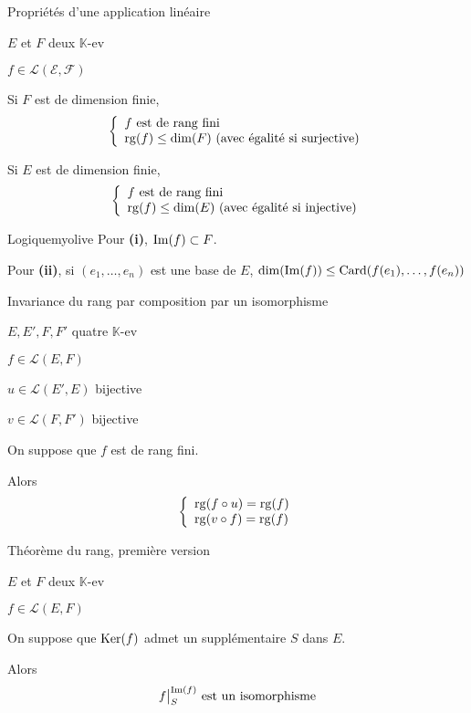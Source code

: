     \begin{prop}{Propriétés d’une application linéaire}{}
        \begin{soient}
            \item $E$ et $F$ deux $\mathbb{K}$-ev
            \item $f \in \mathcal{L}(\mathcal{E},\mathcal{F})$
        \end{soient}
        \begin{alors}
            \item Si $F$ est de dimension finie, 
            \[ \et{f \text{ est de rang fini}}{\rg(f) \leq \dim(F) \text{ (avec égalité si surjective)}} \]
            \item Si $E$ est de dimension finie, 
            \[ \et{f \text{ est de rang fini}}{\rg(f) \leq \dim(E) \text{ (avec égalité si injective)}} \]
        \end{alors}
    \end{prop}
    
    \begin{demo}{Logique}{myolive}
        Pour \textbf{(i)}, $\operatorname{Im}(f) \subset F$.
    
        Pour \textbf{(ii)}, si $(e_1,\ldots,e_n)$ est une base de $E$, $\dim(\operatorname{Im}(f)) \leq \operatorname{Card}(f(e_1),\ldots,f(e_n))$
    \end{demo}
    
    \begin{prop}{Invariance du rang par composition par un isomorphisme}{}
        \begin{soient}
            \item $E,E',F,F'$ quatre $\mathbb{K}$-ev
            \item $f \in \mathcal{L}(E,F)$
            \item $u \in \mathcal{L}(E',E)$ bijective
            \item $v \in \mathcal{L}(F,F')$ bijective
        \end{soient}
        On suppose que $f$ est de rang fini.
    
        Alors \[ \et{\rg(f \circ u) = \rg(f)}{\rg(v \circ f) = \rg(f)} \]
    \end{prop}

    \begin{theo}{Théorème du rang, première version}{}
        \begin{soient}
            \item $E$ et $F$ deux $\mathbb{K}$-ev
            \item $f \in \mathcal{L}(E,F)$
        \end{soient}
        On suppose que $\operatorname{Ker}(f)$ admet un supplémentaire $S$ dans $E$.
    
        Alors \[ \restrcorestr{f}{S}{\Ima(f)} \text{ est un isomorphisme} \]
    \end{theo}
    
